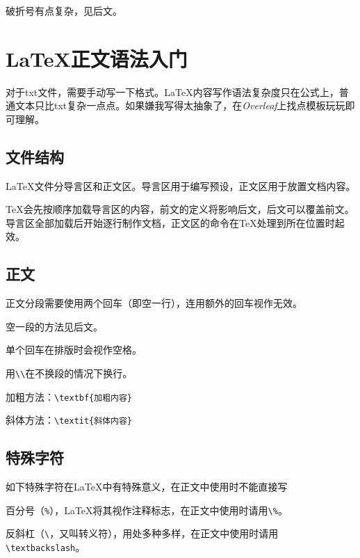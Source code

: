 \documentclass[10pt,openany]{book}
\begin{document}
\begin{sloppypar}
    破折号有点复杂，见后文\textit{}。

    \section{{\LaTeX}正文语法入门}

    对于txt文件，需要手动写一下格式。{\LaTeX}内容写作语法复杂度只在公式上，普通文本只比txt复杂一点点。如果嫌我写得太抽象了，在\textit{Overleaf}上找点模板玩玩即可理解。

    \subsection{文件结构}

    {\LaTeX}文件分导言区和正文区。导言区用于编写预设，正文区用于放置文档内容。

    

    {\TeX}会先按顺序加载导言区的内容，前文的定义将影响后文，后文可以覆盖前文。导言区全部加载后开始逐行制作文档，正文区的命令在{\TeX}处理到所在位置时起效。

    \subsection{正文}

    正文分段需要使用两个回车（即空一行），连用额外的回车视作无效。

    空一段的方法见后文\textit{}。

    单个回车在排版时会视作空格。

    用\texttt{\textbackslash{}\textbackslash{}}在不换段的情况下换行。

    加粗方法：\texttt{\textbackslash{}textbf\{加粗内容\}}

    斜体方法：\texttt{\textbackslash{}textit\{斜体内容\}}

    \subsection{特殊字符}

    如下特殊字符在{\LaTeX}中有特殊意义，在正文中使用时不能直接写

    百分号（\texttt{\%}），{\LaTeX}将其视作注释标志，在正文中使用时请用\texttt{\textbackslash{}\%}。

    反斜杠（\texttt{\textbackslash{}}，又叫转义符），用处多种多样，在正文中使用时请用\texttt{\textbackslash{}textbackslash}。


\end{sloppypar}
\end{document}
